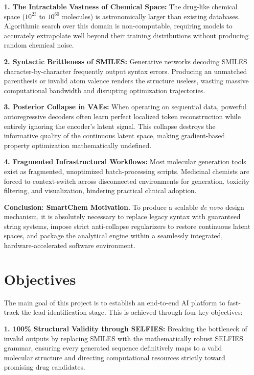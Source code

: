 \documentclass[12pt,a4paper]{report}
\begin{document}
\textbf{1. The Intractable Vastness of Chemical Space:} The drug-like chemical space ($10^{23}$ to $10^{60}$ molecules) is astronomically larger than existing databases. Algorithmic search over this domain is non-computable, requiring models to accurately extrapolate well beyond their training distributions without producing random chemical noise.

\textbf{2. Syntactic Brittleness of SMILES:} Generative networks decoding SMILES character-by-character frequently output syntax errors. Producing an unmatched parenthesis or invalid atom valence renders the structure useless, wasting massive computational bandwidth and disrupting optimization trajectories. 

\textbf{3. Posterior Collapse in VAEs:} When operating on sequential data, powerful autoregressive decoders often learn perfect localized token reconstruction while entirely ignoring the encoder's latent signal. This collapse destroys the informative quality of the continuous latent space, making gradient-based property optimization mathematically undefined.

\textbf{4. Fragmented Infrastructural Workflows:} Most molecular generation tools exist as fragmented, unoptimized batch-processing scripts. Medicinal chemists are forced to context-switch across disconnected environments for generation, toxicity filtering, and visualization, hindering practical clinical adoption.

\textbf{Conclusion: SmartChem Motivation.} To produce a scalable \textit{de novo} design mechanism, it is absolutely necessary to replace legacy syntax with guaranteed string systems, impose strict anti-collapse regularizers to restore continuous latent spaces, and package the analytical engine within a seamlessly integrated, hardware-accelerated software environment.

\section{Objectives}

The main goal of this project is to establish an end-to-end AI platform to fast-track the lead identification stage. This is achieved through four key objectives:

\textbf{1. 100\% Structural Validity through SELFIES:} Breaking the bottleneck of invalid outputs by replacing SMILES with the mathematically robust SELFIES grammar, ensuring every generated sequence definitively maps to a valid molecular structure and directing computational resources strictly toward promising drug candidates.
\end{document}
